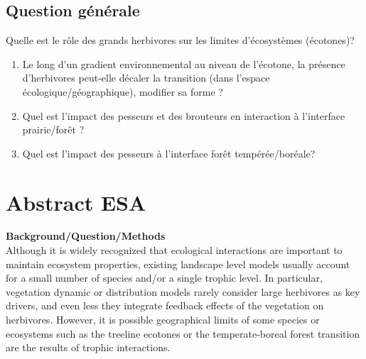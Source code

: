 

\subsection*{Question générale}

Quelle est le rôle des grands herbivores sur les limites d'écosystèmes (écotones)?

\vspace{1em}

\begin{enumerate}

\item Le long d'un gradient environnemental au niveau de l'écotone, la
présence d'herbivores peut-elle décaler la transition (dans l'espace
écologique/géographique), modifier sa forme ?

\item Quel est l'impact des pesseurs et des brouteurs en interaction à
l'interface prairie/forêt ?

\item Quel est l'impact des pesseurs à l'interface forêt tempérée/boréale?

\end{enumerate}



\newpage

\section*{Abstract ESA}

\textbf{Background/Question/Methods}\\

Although it is widely recognized that ecological interactions are important to
maintain ecosystem properties, existing landscape level models usually account
for a small number of species and/or a single trophic level. In particular,
vegetation dynamic or distribution models rarely consider large herbivores as
key drivers, and even less they integrate feedback effects of the vegetation
on herbivores. However, it is possible geographical limits of some species or
ecosystems such as the treeline ecotones or the temperate-boreal forest
transition are the results of trophic interactions.

